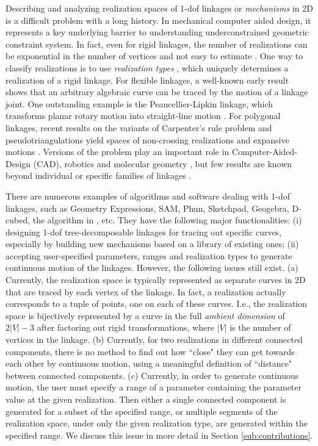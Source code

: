 \documentclass[secthm,amsthm,english]{article}
\theoremstyle{definition}
\theoremstyle{remark}
\begin{document}
Describing and analyzing realization spaces of 1-dof linkages
or \emph{mechanisms} in 2D is 
a  difficult problem with a long history. 
In mechanical computer aided design, it represents a key underlying barrier
to understanding underconstrained geometric constraint system.
In fact, even for rigid linkages, the number of realizations can be exponential in the number of vertices
and not easy to estimate \cite{bib:Borcea}. 
One way to classify realizations is to use \emph{realization types} \cite{bib:navigation,bib:FudHo97},  
which uniquely determines a realization of a rigid linkage. 
For flexible linkages, 
a well-known early result \cite{kempe1875} 
shows that an arbitrary algebraic curve can be traced by the motion of a linkage joint. 
One outstanding example is the Peaucellier-Lipkin linkage, which transforms planar rotary motion into straight-line motion \cite{bib:Kempe}. 
For polygonal linkages, recent results on the variants of Carpenter's rule problem and pseudotriangulations yield spaces of non-crossing realizations and expansive motions \cite{bib:streinu05,streinu2000combinatorail,bib:straightening,bib:rote03}.
Versions of the problem play an important role in Computer-Aided-Design (CAD), 
robotics and molecular geometry \cite{bib:sacks10,bib:Yang,bib:survey}, but few results are known beyond individual or specific families of linkages \cite{bib:JoanArinyo03,bib:hilderick06,bib:henneberg,bib:ZhangGao06}. 

There are numerous examples of algorithms and software dealing with 1-dof linkages, 
such as Geometry Expressions, SAM,  Phun, Sketchpad, Geogebra, D-cubed, 
the algorithm in \cite{bib:hidalgo2011reachability}, etc. 
They have the following major functionalities: 
(i) designing 1-dof tree-decomposable linkages for tracing out specific curves, 
especially by building new mechanisms based on a library of existing ones;
(ii) accepting user-specified parameters, ranges and realization types to generate 
continuous motion of the linkages. 
However, the following issues still exist. 
(a) Currently, 
the realization space is typically represented as separate curves in 2D that are 
traced by each vertex of the linkage. 
In fact, 
a realization actually corresponds to a tuple of points, one on each of these curves.
I.e., the realization space is bijectively represented by a curve in the full \emph{ambient dimension} of $2|V|-3$ after factoring out rigid transformations, 
where $|V|$ is the number of vertices in the linkage. 
(b) Currently, 
for two realizations in different connected components, 
there is no method to find out how ``close" they can get towards each other by continuous motion, 
using a meaningful definition of ``distance" between connected components. 
(c) Currently, in order to generate continuous motion, 
the user must specify a range of a parameter containing the parameter value at the given realization.
Then either a single connected component is generated
for a subset of the specified range, 
or multiple segments of the realization space, under only the given realization type,  
are generated within the specified range. 
We discuss this issue in more detail in Section \ref{sub:contributions}.
\end{document}
